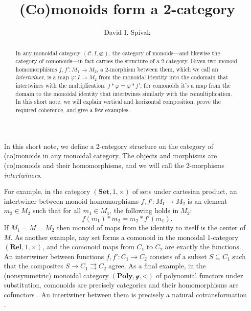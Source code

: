 \documentclass[11pt, one side, article]{memoir}
\theoremstyle{definition}
\theoremstyle{plain}
\renewcommand{\ss}{\subseteq}
\newcommand{\cat}[1]{\mathcal{#1}}%
\newcommand{\Cat}[1]{\mathbf{#1}}%
\newcommand{\tto}{\rightrightarrows}
\newcommand{\smset}{\Cat{Set}}
\newcommand{\yon}{\mathcal{y}}
\newcommand{\poly}{\Cat{Poly}}
\newcommand{\0}{\textsf{0}}
\newcommand{\1}{\tn{\textsf{1}}}
\newcommand{\tri}{\mathbin{\triangleleft}}
\begin{document}
\title{(Co)monoids form a 2-category}

\author{David I. Spivak}


\maketitle

\begin{abstract}
In any monoidal category $(\cat{C},I,\otimes)$, the category of monoids---and likewise the category of comonoids---in fact carries the structure of a 2-category. Given two monoid homomorphisms $f,f'\colon M_1\to M_2$, a 2-morphism between them, which we call an \emph{intertwiner}, is a map $\varphi\colon I\to M_2$ from the monoidal identity into the codomain that intertwines with the multiplication: $f*\varphi=\varphi*f'$; for comonoids it's a map from the domain to the monoidal identity that intertwines similarly with the comultiplication. In this short note, we will explain vertical and horizontal composition, prove the required coherence, and give a few examples.
\end{abstract}

In this short note, we define a 2-category structure on the category of (co)monoids in any monoidal category. The objects and morphisms are (co)monoids and their homomorphisms, and we will call the 2-morphisms \emph{intertwiners}.

For example, in the category $(\smset,1,\times)$ of sets under cartesian product, an intertwiner between monoid homomorphisms $f,f'\colon M_1\to M_2$ is an element $m_2\in M_2$ such that for all $m_1\in M_1$, the following holds in $M_2$:
\[
f(m_1)*m_2=m_2*f'(m_1).
\]
If $M_1=M=M_2$ then monoid of maps from the identity to itself is the center of $M$. As another example, any set forms a comonoid in the monoidal 1-category $(\Cat{Rel},1,\times)$, and the comonoid maps from $C_1$ to $C_2$ are exactly the functions. An intertwiner between functions $f,f'\colon C_1\to C_2$ consists of a subset $S\ss C_1$ such that the composites $S\to C_1\tto C_2$ agree. As a final example, in the (nonsymmetric) monoidal category $(\poly,\yon,\tri)$ of polynomial functors under substitution, comonoids are precisely categories \cite{ahman2016directed} and their homomorphisms are cofunctors \cite{aguiar1997internal}. An intertwiner between them is precisely a natural cotransformation \cite{clarke2022introduction}.
\end{document}
